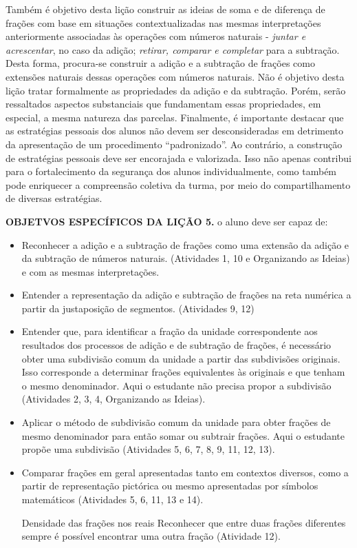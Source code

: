 \begin{multicols}{2}
  Também é objetivo desta lição construir as ideias de soma e de diferença de frações com base em situações contextualizadas nas mesmas interpretações anteriormente associadas às operações com números naturais -   {\it juntar e acrescentar}, no caso da adição;    {\it retirar, comparar e completar}   para a subtração. Desta forma, procura-se construir a adição e a subtração de frações como extensões naturais dessas operações com números naturais. Não é objetivo desta lição tratar formalmente as propriedades da adição e da subtração. Porém, serão ressaltados aspectos substanciais que fundamentam essas propriedades, em especial, a mesma natureza das parcelas.
  Finalmente, é importante destacar que as estratégias pessoais dos alunos não devem ser desconsideradas em detrimento da apresentação de um procedimento   ``padronizado''. Ao contrário, a construção de estratégias pessoais deve ser encorajada e valorizada. Isso não apenas contribui para o fortalecimento da segurança dos alunos individualmente, como também pode enriquecer a compreensão coletiva da turma, por meio do compartilhamento de diversas estratégias.
\clearpage

\textbf{OBJETVOS ESPECÍFICOS DA LIÇÃO 5.} o aluno deve ser capaz de:
\begin{itemize}
\item Reconhecer a adição e a subtração de frações como uma extensão da adição e da subtração de números naturais. (Atividades 1, 10 e Organizando as Ideias) e com as mesmas interpretações. 
\item Entender a representação da adição e subtração de frações na reta numérica a partir da justaposição de segmentos. (Atividades 9, 12)
\item Entender que, para identificar a fração da unidade correspondente aos resultados dos processos de adição e de subtração de frações, é necessário obter uma subdivisão comum da unidade a partir das subdivisões originais. Isso corresponde a determinar frações equivalentes às originais e que tenham o mesmo denominador. Aqui o estudante não precisa propor a subdivisão (Atividades 2, 3, 4, Organizando as Ideias).
\item Aplicar o método de subdivisão comum da unidade para obter frações de mesmo denominador para então somar ou subtrair frações. Aqui o estudante propõe uma subdivisão (Atividades 5, 6, 7, 8, 9, 11, 12, 13).
\item Comparar frações em geral apresentadas tanto em contextos diversos, como a partir de representação pictórica ou mesmo apresentadas por símbolos matemáticos (Atividades 5, 6, 11, 13 e 14).
\item [Densidade das frações nos reais] Reconhecer que entre duas frações diferentes sempre é possível encontrar uma outra fração (Atividade 12).
\end{itemize}


\end{multicols}
